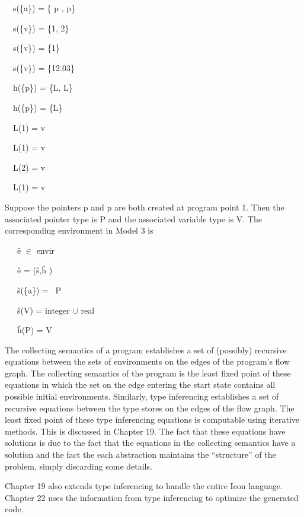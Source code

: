 \bigskip

{\ttfamily\mdseries
\ \ s(\{a\}) = \{ p , p\}}

{\ttfamily\mdseries
\ \ s(\{v\}) = \{1, 2\}}

{\ttfamily\mdseries
\ \ s(\{v\}) = \{1\}}

{\ttfamily\mdseries
\ \ s(\{v\}) = \{12.03\}}


\bigskip

{\ttfamily\mdseries
\ \ h(\{p\}) = \{L, L\}}

{\ttfamily\mdseries
\ \ h(\{p\}) = \{L\}}


\bigskip

{\ttfamily\mdseries
\ \ L(1) = v}


\bigskip

{\ttfamily\mdseries
\ \ L(1) = v}

{\ttfamily\mdseries
\ \ L(2) = v}


\bigskip

{\ttfamily\mdseries
\ \ L(1) = v}

Suppose the pointers p and p are
both created at program point 1. Then the associated pointer type is
P and the associated variable type is
V. The corresponding environment in Model 3 is

{\ttfamily\mdseries
\ \ \ \^e \textrm{${\in}$} envir\TextSubscript{[3]}}

{\ttfamily\mdseries
\ \ \ \^e = (\^s,\^h\textrm{ })}


\bigskip

{\ttfamily\mdseries
\ \ \ \^s(\{a\}) = \ P}

{\ttfamily\mdseries
\ \ \ \^s(V) = integer \textrm{${\cup}$ }real}


\bigskip

{\ttfamily\mdseries
\ \ \ \^h(P) = V}


The collecting semantics of a program establishes a set of (possibly)
recursive equations between the sets of environments on the edges of
the program's flow graph. The collecting semantics of the program is
the least fixed point of these equations in which the set on the edge
entering the start state contains all possible initial environments.
Similarly, type inferencing establishes a set of recursive equations
between the type stores on the edges of the flow graph. The least
fixed point of these type inferencing equations is computable using
iterative methods. This is discussed in Chapter 19. The fact that
these equations have solutions is due to the fact that the equations
in the collecting semantics have a solution and the fact the each
abstraction maintains the ``structure'' of the problem, simply
discarding some details.

Chapter 19 also extends type inferencing to handle the entire Icon
language. Chapter 22 uses the information from type inferencing to
optimize the generated code.

\bigskip
